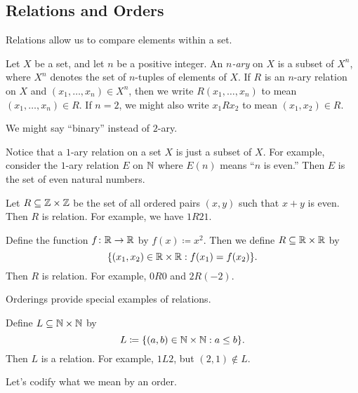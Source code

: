 \documentclass[../notes.tex]{subfiles}
\begin{document}
\subsection{Relations and Orders}
Relations allow us to compare elements within a set.
\begin{definition}[relation]
    Let $X$ be a set, and let $n$ be a positive integer. An \emph{$n$-ary } on $X$ is a subset of $X^n$, where $X^n$ denotes the set of $n$-tuples of elements of $X$. If $R$ is an $n$-ary relation on $X$ and $(x_1, \ldots, x_n) \in X^n$, then we write $R(x_1, \ldots, x_n)$ to mean $(x_1,\ldots,x_n)\in R$. If $n=2$, we might also write $x_1Rx_2$ to mean $(x_1,x_2)\in R$.
\end{definition}
We might say ``binary'' instead of $2$-ary.
\begin{example}
    Notice that a $1$-ary relation on a set $X$ is just a subset of $X$. For example, consider the $1$-ary relation $E$ on $\mathbb N$ where $E(n)$ means ``$n$ is even.'' Then $E$ is the set of even natural numbers. 
\end{example}
\begin{example}
    Let $R\subseteq\mathbb Z\times\mathbb Z$ be the set of all ordered pairs $(x,y)$ such that $x+y$ is even. Then $R$ is relation. For example, we have $1R21$.
\end{example}
\begin{example} \label{ex:f-gives-equiv-relation}
    Define the function $f\colon\mathbb R\to\mathbb R$ by $f(x)\coloneqq x^2$. Then we define $R\subseteq\mathbb R\times\mathbb R$ by
    \[\{(x_1,x_2)\in\mathbb R\times\mathbb R:f(x_1)=f(x_2)\}.\]
    Then $R$ is relation. For example, $0R0$ and $2R(-2)$.
\end{example}
Orderings provide special examples of relations.
\begin{example} \label{ex:le-on-n}
    Define $L\subseteq\mathbb N\times\mathbb N$ by
    \[L\coloneqq\{(a,b)\in\mathbb N\times\mathbb N:a\le b\}.\]
    Then $L$ is a relation. For example, $1L2$, but $(2,1)\notin L$.
\end{example}
Let's codify what we mean by an order.
\end{document}
